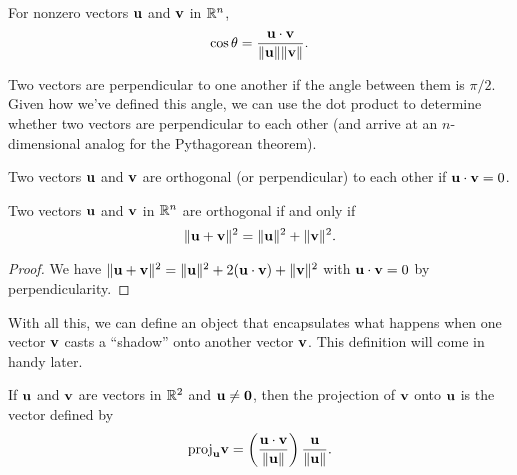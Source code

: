 \documentclass[../m073main.tex]{subfiles}
\begin{document}
\begin{definition}[Angle]
	For nonzero vectors $\mathbf{u}$ and $\mathbf{v}$ in $\mathbb{R}^n$,
	\[ \cos \theta = \frac{\mathbf{u} \cdot \mathbf{v}}{\|\mathbf{u}\| \|\mathbf{v}\|}. \]
\end{definition}

Two vectors are perpendicular to one another if the angle between them is $\pi / 2$.
Given how we've defined this angle, we can use the dot product to determine whether two vectors are perpendicular to each other (and arrive at an $n$-dimensional analog for the Pythagorean theorem).

\begin{definition}[Orthogonality]
	Two vectors $\mathbf{u}$ and $\mathbf{v}$ are orthogonal (or perpendicular) to each other if $\mathbf{u} \cdot \mathbf{v} = 0$.
\end{definition}

\begin{theorem}
	Two vectors $\mathbf{u}$ and $\mathbf{v}$ in $\mathbb{R}^n$ are orthogonal if and only if
	\[ \|\mathbf{u} + \mathbf{v}\|^2 = \|\mathbf{u}\|^2 + \|\mathbf{v}\|^2. \]
\end{theorem}

\begin{proof}
	We have $\|\mathbf{u} + \mathbf{v}\|^2 = \| \mathbf{u} \|^2 + 2 (\mathbf{u} \cdot \mathbf{v}) + \| \mathbf{v} \|^2$ with $\mathbf{u} \cdot \mathbf{v} = 0$ by perpendicularity.
\end{proof}

With all this, we can define an object that encapsulates what happens when one vector $\mathbf{v}$ casts a ``shadow'' onto another vector $\mathbf{v}$.
This definition will come in handy later.

\begin{definition}
	If $\mathbf{u}$ and $\mathbf{v}$ are vectors in $\mathbb{R}^2$ and $\mathbf{u} \neq \mathbf{0}$, then the projection of $\mathbf{v}$ onto $\mathbf{u}$ is the vector defined by
	\[ \textrm{proj}_{\mathbf{u}} \mathbf{v} = \left( \frac{\mathbf{u} \cdot \mathbf{v}}{\|\mathbf{u}\|} \right) \frac{\mathbf{u}}{\|\mathbf{u}\|}. \]
\end{definition}
\end{document}
